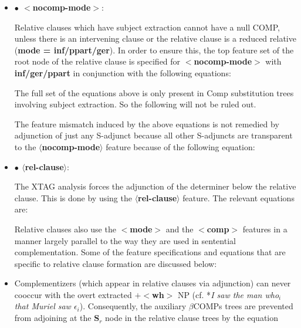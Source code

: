\begin{itemize}
\item {\bf $\bullet$ $<$nocomp-mode$>$}:

Relative clauses which have subject extraction cannot have a null COMP,
unless there is an intervening clause or the relative clause is a reduced
relative ({\bf mode = inf/ppart/ger}). In order to ensure this, the top
feature set of the root node of the relative clause is specified for {\bf
$<$nocomp-mode$>$} with {\bf inf/ger/ppart} in conjunction with the
following equations:


The full set of the equations above is only present in Comp
substitution trees involving subject extraction. So the following will
not be ruled out.


The feature mismatch induced by the above equations is not remedied by
adjunction of just any S-adjunct because all other S-adjuncts are
transparent to the {\bf $\langle$nocomp-mode$\rangle$} feature because of the
following equation:


\item {\bf $\bullet$ $\langle$rel-clause$\rangle$}:

The XTAG analysis forces the adjunction of the determiner below the
relative clause. This is done by using the {\bf
$\langle$rel-clause$\rangle$} feature. The relevant equations are:


Relative clauses also use the {\bf $<$mode$>$} and the {\bf $<$comp$>$}
features in a manner largely parallel to the way they are used in
sentential complementation. Some of the feature specifications and
equations that are specific to relative clause formation are discussed
below:

\item Complementizers (which appear in relative clauses via adjunction)
can never cooccur with the overt extracted {\bf $+<$wh$>$} NP (cf. *{\it I
saw the man who$_i$ that Muriel saw $\epsilon$$_{i}$}).  Consequently, the
auxiliary $\beta$COMPs trees are prevented from adjoining at the {\bf
S$_r$} node in the relative clause trees by the equation


\end{itemize}
